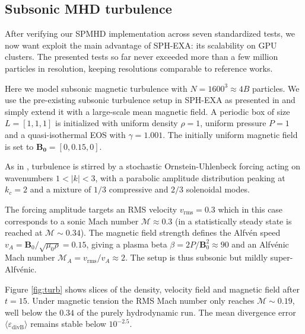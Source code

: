 
\subsection{Subsonic MHD turbulence}
\label{sec:mhd_turb}

After verifying our SPMHD implementation across seven standardized tests, we now want exploit the main advantage of SPH-EXA: its scalability on GPU clusters. The presented tests so far never exceeded more than a few million particles in resolution, 
keeping resolutions comparable to reference works. 

Here we model subsonic magnetic turbulence with $N=1600^3\approx4B$ particles. We use the pre-existing subsonic turbulence setup in SPH-EXA as presented in \cite{Cabezon2026} and simply extend it with a large-scale mean magnetic field. A periodic box of size $L=[1,1,1]$ is initialized with uniform density $\rho=1$, uniform pressure $P=1$ and a quasi-isothermal EOS with $\gamma=1.001$. The initially uniform magnetic field is set to $\mathbf{B_0}=[0,0.15,0]$. 

As in \cite{Cabezon2026}, turbulence is stirred by a stochastic Ornstein-Uhlenbeck forcing acting on wavenumbers $1 < |k| < 3$, with a parabolic amplitude distribution peaking at $k_c = 2$ and a mixture of $1/3$ compressive and $2/3$ solenoidal modes. 

The forcing amplitude targets an RMS velocity $v_\mathrm{rms} = 0.3$ which in this case corresponds to a sonic Mach number $\mathcal{M} \approx 0.3$ (in \cite{Cabezon2026} a statistically steady state is reached at $\mathcal{M} \sim 0.34$). The magnetic field strength defines the Alfvén speed $v_A = \mathbf{B}_0/\sqrt{\mu_0\rho} = 0.15$, giving a plasma beta $\beta = 2P/\mathbf{B}_0^2 \approx 90$ and an Alfvénic Mach number $\mathcal{M}_A = v_\mathrm{rms}/v_A \approx 2$. The setup is thus subsonic but mildly super-Alfvénic. 

Figure \ref{fig:turb} shows slices of the density, velocity field and magnetic field after $t=15$. Under magnetic tension the RMS Mach number only reaches $\mathcal{M}\sim0.19$, well below the $0.34$ of the purely hydrodynamic run. The mean divergence error $\langle \varepsilon_{\text{divB}}\rangle$ remains stable below $10^{-2.5}$.

